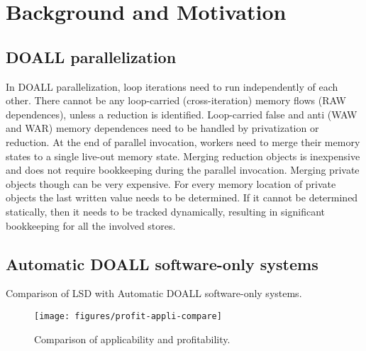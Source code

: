 \section{Background and Motivation}
\label{sec:motivation}

\subsection{DOALL parallelization}

In DOALL parallelization, loop iterations need to run independently of each
other.  There cannot be any loop-carried (cross-iteration) memory flows (RAW
dependences), unless a reduction is identified. Loop-carried false and anti (WAW
and WAR) memory dependences need to be handled by privatization or reduction.
At the end of parallel invocation, workers need to merge their memory states to
a single live-out memory state.  Merging reduction objects is inexpensive and
does not require bookkeeping during the parallel invocation.  Merging private
objects though can be very expensive. For every memory location of private
objects the last written value needs to be determined. If it cannot be
determined statically, then it needs to be tracked dynamically, resulting in
significant bookkeeping for all the involved stores.

\subsection{Automatic DOALL software-only systems}

\begin{table*}
  
  \caption{
    Comparison of LSD with Automatic DOALL software-only systems.
  }
  \label{tab:related-work}
    \vspace{-5pt}
\end{table*}

\begin{figure}
  \texttt{[image: figures/profit-appli-compare]}
  \caption{Comparison of applicability and profitability.}
  \label{fig:profit-appli-compare}
\end{figure}


